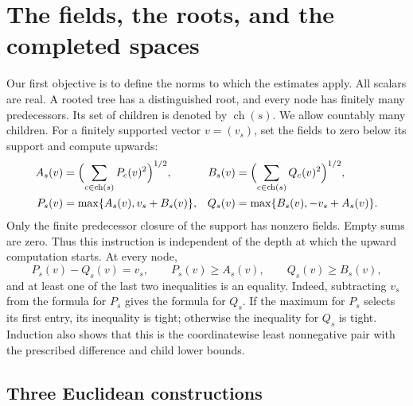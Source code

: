 \section{The fields, the roots, and the completed spaces}\label{rec:norms}

Our first objective is to define the norms to which the estimates apply.
All scalars are real. A rooted tree has a distinguished root, and every
node has finitely many predecessors. Its set of children is denoted by
$\operatorname{ch}(s)$. We allow countably many children.
For a finitely supported vector $v=(v_s)$, set the fields to zero below
its support and compute upwards:
\begin{align}
 A_s(v)&=\Bigl(\sum_{c\in\operatorname{ch}(s)}P_c(v)^2\Bigr)^{1/2},&
 B_s(v)&=\Bigl(\sum_{c\in\operatorname{ch}(s)}Q_c(v)^2\Bigr)^{1/2},\notag\\
 P_s(v)&=\max\{A_s(v),v_s+B_s(v)\},&
 Q_s(v)&=\max\{B_s(v),-v_s+A_s(v)\}.
 \label{rec:definition}
\end{align}
Only the finite predecessor closure of the support has nonzero fields.
Empty sums are zero. Thus this instruction is independent of the depth
at which the upward computation starts. At every node,
\begin{equation}\label{rec:field-properties}
 P_s(v)-Q_s(v)=v_s,\qquad P_s(v)\ge A_s(v),\qquad Q_s(v)\ge B_s(v),
\end{equation}
and at least one of the last two inequalities is an equality.
Indeed, subtracting $v_s$ from the formula for $P_s$ gives the formula
for $Q_s$. If the maximum for $P_s$ selects its first entry, its inequality
is tight; otherwise the inequality for $Q_s$ is tight.
Induction also shows that this is the coordinatewise least nonnegative
pair with the prescribed difference and child lower bounds.

\subsection{Three Euclidean constructions}

